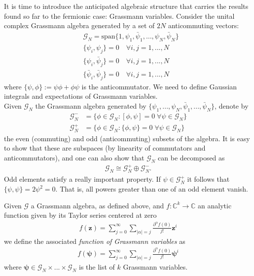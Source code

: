 It is time to introduce the anticipated algebraic structure that carries the results found so
far to the fermionic case: Grassmann variables. Consider the unital complex Grassmann algebra
generated by a set of $2N$ anticommuting vectors:
\begin{equation}
	\begin{split}
	\label{def:grassmann}
		&\mathcal{G}_N = \mathrm{span}\{ 1, \psi_1, \bar\psi_1, \ldots, \psi_N, \bar\psi_N \} \\
		&\{ \psi_i, \psi_j \}         = 0 \quad \forall i,j=1,...,N \\
		&\{ \psi_i, \bar\psi_j \}     = 0 \quad \forall i,j=1,...,N \\
		&\{ \bar\psi_i, \bar\psi_j \} = 0 \quad \forall i,j=1,...,N
	\end{split}
\end{equation}
where $\{\psi, \phi\} := \psi\phi + \phi\psi$ is the anticommutator. We need to define
Gaussian integrals and expectations of Grassmann variables.
\\
Given $\mathcal{G}_N$ the Grassmann algebra generated by
$\{\psi_1, ..., \psi_N, \bar\psi_1, ..., \bar\psi_N\}$, denote by
\begin{align*}
	\mathcal{G}_N^{-} &= \{
		\phi \in \mathcal{G}_N : [\phi, \psi] = 0 \;\forall \psi \in \mathcal{G}_N
	\} \\
		\mathcal{G}_N^{+} &= \{
		\phi \in \mathcal{G}_N : \{\phi, \psi\} = 0 \;\forall \psi \in \mathcal{G}_N
	\}
\end{align*}
the even (commuting) and odd (anticommuting) subsets of the algebra. It is easy to show that
these are subspaces (by linearity of commutators and anticommutators), and one can also show
that $\mathcal{G}_N$ can be decomposed as
\begin{align*}
	\mathcal{G}_N \cong \mathcal{G}_N^{+} \oplus \mathcal{G}_N^{-}.
\end{align*}
Odd elements satisfy a really important property. If $\psi \in \mathcal{G}_N^{+}$ it follows
that $\{\psi,\psi\} = 2\psi^2 = 0$. That is, all powers greater than one of an odd element vanish.

\begin{definition}
	Given $\mathcal{G}$ a Grassmann algebra, as defined above, and $f : \mathbb{C}^k \to \mathbb{C}$
	an analytic function given by its Taylor series centered at zero
	\begin{align*}
		f(\boldsymbol{z}) = \sum_{j=0}^\infty \sum_{|\alpha| = j}
		\frac{\partial^\alpha f(0)}{j!} \boldsymbol{z}^i
	\end{align*}
	we define the associated \textit{function of Grassmann variables} as
	\begin{align*}
		f(\boldsymbol{\psi}) = \sum_{j=0}^\infty \sum_{|\alpha| = j}
		\frac{\partial^\alpha f(0)}{j!} \boldsymbol{\psi}^i
	\end{align*}
	where $\boldsymbol{\psi} \in \mathcal{G}_N \times ... \times \mathcal{G}_N$ is the list of
	$k$ Grassmann variables.
\end{definition}

